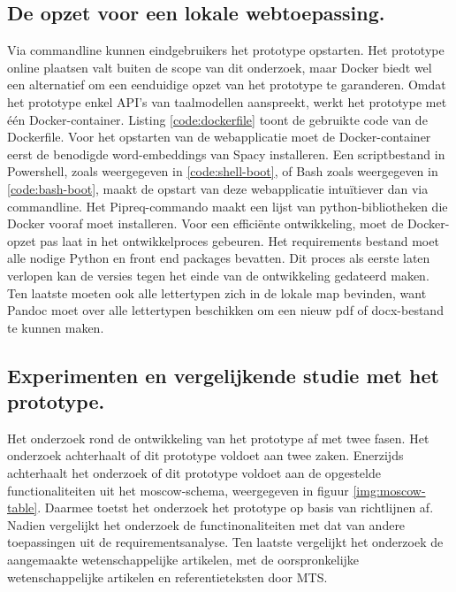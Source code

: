 \subsection{De opzet voor een lokale webtoepassing.}

Via commandline kunnen eindgebruikers het prototype opstarten. Het prototype online plaatsen valt buiten de scope van dit onderzoek, maar Docker biedt wel een alternatief om een eenduidige opzet van het prototype te garanderen. Omdat het prototype enkel API's van taalmodellen aanspreekt, werkt het prototype met één Docker-container. Listing \ref{code:dockerfile} toont de gebruikte code van de Dockerfile. Voor het opstarten van de webapplicatie moet de Docker-container eerst de benodigde word-embeddings van Spacy installeren. Een scriptbestand in Powershell, zoals weergegeven in \ref{code:shell-boot}, of Bash zoals weergegeven in \ref{code:bash-boot}, maakt de opstart van deze webapplicatie intuïtiever dan via commandline. Het Pipreq-commando maakt een lijst van python-bibliotheken die Docker vooraf moet installeren. Voor een efficiënte ontwikkeling, moet de Docker-opzet pas laat in het ontwikkelproces gebeuren. Het requirements bestand moet alle nodige Python en front end packages bevatten. Dit proces als eerste laten verlopen kan de versies tegen het einde van de ontwikkeling gedateerd maken. Ten laatste moeten ook alle lettertypen zich in de lokale map bevinden, want Pandoc moet over alle lettertypen beschikken om een nieuw pdf of docx-bestand te kunnen maken.


\subsection{Experimenten en vergelijkende studie met het prototype.}

Het onderzoek rond de ontwikkeling van het prototype af met twee fasen. Het onderzoek achterhaalt of dit prototype voldoet aan twee zaken. Enerzijds achterhaalt het onderzoek of dit prototype voldoet aan de opgestelde functionaliteiten uit het moscow-schema, weergegeven in figuur \ref{img:moscow-table}. Daarmee toetst het onderzoek het prototype op basis van richtlijnen af. Nadien vergelijkt het onderzoek de functinonaliteiten met dat van andere toepassingen uit de requirementsanalyse. Ten laatste vergelijkt het onderzoek de aangemaakte wetenschappelijke artikelen, met de oorspronkelijke wetenschappelijke artikelen en referentieteksten door MTS.